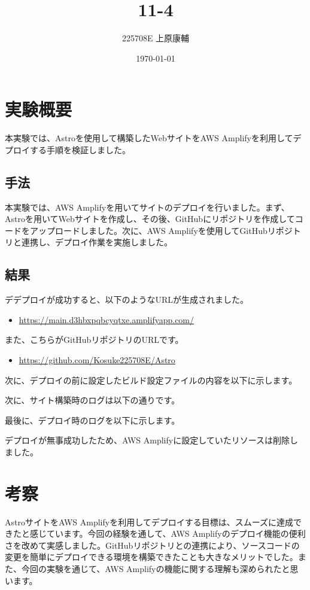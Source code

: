 \documentclass[a4paper, 11pt, titlepage]{jsarticle}
\title{11-4}
\author{225708E 上原康輔}
\date{\today}
\begin{document}
\maketitle  
\clearpage
\tableofcontents
\clearpage
\section{実験概要}
\indent 本実験では、Astroを使用して構築したWebサイトをAWS Amplifyを利用してデプロイする手順を検証しました。
\subsection{手法}
\indent 本実験では、AWS Amplifyを用いてサイトのデプロイを行いました。まず、Astroを用いてWebサイトを作成し、その後、GitHubにリポジトリを作成してコードをアップロードしました。次に、AWS Amplifyを使用してGitHubリポジトリと連携し、デプロイ作業を実施しました。
\subsection{結果}
\indent デデプロイが成功すると、以下のようなURLが生成されました。
\begin{itemize}
  \item \url{https://main.d3hbxpqbcyqtxe.amplifyapp.com/}
\end{itemize}
\indent また、こちらがGitHubリポジトリのURLです。
\begin{itemize}
  \item \url{https://github.com/Kosuke225708E/Astro}
\end{itemize}
\indent 次に、デプロイの前に設定したビルド設定ファイルの内容を以下に示します。

\indent 次に、サイト構築時のログは以下の通りです。

\indent 最後に、デプロイ時のログを以下に示します。

\indent デプロイが無事成功したため、AWS Amplifyに設定していたリソースは削除しました。
\section{考察}
\indent AstroサイトをAWS Amplifyを利用してデプロイする目標は、スムーズに達成できたと感じています。今回の経験を通して、AWS Amplifyのデプロイ機能の便利さを改めて実感しました。GitHubリポジトリとの連携により、ソースコードの変更を簡単にデプロイできる環境を構築できたことも大きなメリットでした。また、今回の実験を通じて、AWS Amplifyの機能に関する理解も深められたと思います。
\end{document}
